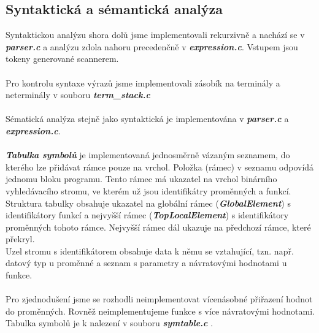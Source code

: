 \documentclass[12pt, letterpaper]{article}
\begin{document}
	\subsection{Syntaktická a sémantická analýza}
    \large
    Syntaktickou analýzu shora dolů jsme implementovali rekurzivně a nachází se v \textbf{\textit{parser.c}} a analýzu zdola nahoru precedenčně v \textbf{\textit{expression.c}}. Vstupem jsou tokeny generované scannerem.
    \\\\
    Pro kontrolu syntaxe výrazů jsme implementovali zásobík na terminály a neterminály v souboru   \textbf{\textit{term\_stack.c}}
    \\\\
    Sématická analýza stejně jako syntaktická je implementována v \textbf{\textit{parser.c}} a \textbf{\textit{expression.c}}.
    \\\\
    \newpage
    \textbf{\textit{Tabulka symbolů}} je implementovaná jednosměrně vázaným seznamem, do kterého lze přidávat rámce pouze na vrchol. Položka (rámec) v seznamu odpovídá jednomu bloku programu. Tento rámec má ukazatel na vrchol binárního vyhledávacího stromu, ve kterém už jsou identifikátry proměnných a funkcí.
    Struktura tabulky obsahuje ukazatel na globální rámec (\textbf{\textit{GlobalElement}}) s identifikátory funkcí a nejvyšší rámec (\textbf{\textit{TopLocalElement}}) s identifikátory proměnných tohoto rámce. Nejvyšší rámec dál ukazuje na předchozí rámce, které překryl.
    \\
     Uzel stromu s identifikátorem obsahuje data k němu se vztahující, tzn. např. datový typ u proměnné a seznam s parametry a návratovými hodnotami u funkce.\\\\
     Pro zjednodušení jsme se rozhodli neimplementovat vícenásobné přiřazení hodnot do proměnných. Rovněž neimplementujeme funkce s více návratovými hodnotami. \\
     Tabulka symbolů je k nalezení v souboru \textbf{\textit{symtable.c}} .
    
\end{document}
